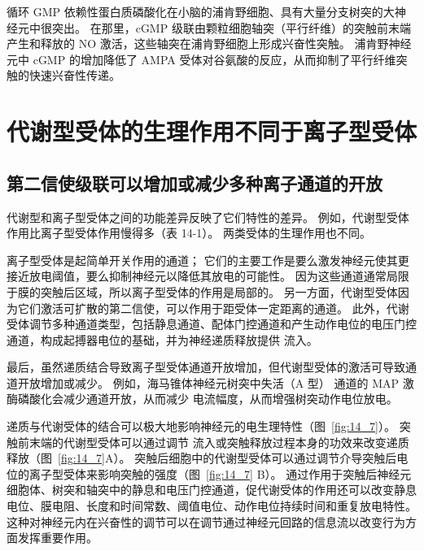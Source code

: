 循环 GMP 依赖性蛋白质磷酸化在小脑的浦肯野细胞、具有大量分支树突的大神经元中很突出。
在那里，cGMP 级联由颗粒细胞轴突（平行纤维）的突触前末端产生和释放的 NO 激活，这些轴突在浦肯野细胞上形成兴奋性突触。
浦肯野神经元中 cGMP 的增加降低了 AMPA 受体对谷氨酸的反应，从而抑制了平行纤维突触的快速兴奋性传递。



\section{代谢型受体的生理作用不同于离子型受体}

\subsection{第二信使级联可以增加或减少多种离子通道的开放}

代谢型和离子型受体之间的功能差异反映了它们特性的差异。
例如，代谢型受体作用比离子型受体作用慢得多（表 14-1）。
两类受体的生理作用也不同。


离子型受体是起简单开关作用的通道；
它们的主要工作是要么激发神经元使其更接近放电阈值，要么抑制神经元以降低其放电的可能性。
因为这些通道通常局限于膜的突触后区域，所以离子型受体的作用是局部的。
另一方面，代谢型受体因为它们激活可扩散的第二信使，可以作用于距受体一定距离的通道。
此外，代谢受体调节多种通道类型，包括静息通道、配体门控通道和产生动作电位的电压门控通道，构成起搏器电位的基础，并为神经递质释放提供  流入。


最后，虽然递质结合导致离子型受体通道开放增加，但代谢型受体的激活可导致通道开放增加或减少。
例如，海马锥体神经元树突中失活（A 型） 通道的 MAP 激酶磷酸化会减少通道开放，从而减少  电流幅度，从而增强树突动作电位放电。


递质与代谢受体的结合可以极大地影响神经元的电生理特性（图~\ref{fig:14_7}）。
突触前末端的代谢型受体可以通过调节  流入或突触释放过程本身的功效来改变递质释放（图~\ref{fig:14_7}A）。
突触后细胞中的代谢型受体可以通过调节介导突触后电位的离子型受体来影响突触的强度（图~\ref{fig:14_7} B）。
通过作用于突触后神经元细胞体、树突和轴突中的静息和电压门控通道，促代谢受体的作用还可以改变静息电位、膜电阻、长度和时间常数、阈值电位、动作电位持续时间和重复放电特性。
这种对神经元内在兴奋性的调节可以在调节通过神经元回路的信息流以改变行为方面发挥重要作用。


